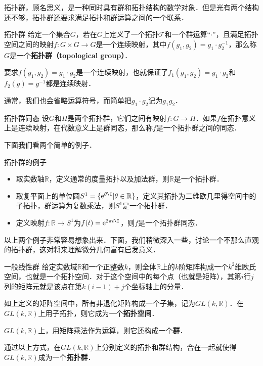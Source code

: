 

拓扑群，顾名思义，是一种同时具有群和拓扑结构的数学对象．但是光有两个结构还不够，拓扑群还要求满足拓扑和群运算之间的一个联系．

\begin{definition}{拓扑群}
给定一个集合$G$，若在$G$上定义了一个拓扑$\mathcal{T}$和一个群运算“$\cdot$”，且满足拓扑空间之间的映射$f:G\times G\rightarrow G$是一个连续映射，其中$f(g_1, g_2)=g_1\cdot g_2^{-1}$，那么称$G$是一个\textbf{拓扑群（topological group）}．
\end{definition}

要求$f(g_1, g_2)=g_1\cdot g_2$是一个连续映射，也就保证了$f_1(g_1, g_2)=g_1\cdot g_2$和$f_2(g)=g^{-1}$都是连续映射．

通常，我们也会省略运算符号，而简单把$g_1\cdot g_2$记为$g_1g_2$．

\begin{definition}{拓扑群同态}
设$G$和$H$是两个拓扑群，它们之间有映射$f:G\rightarrow H$．如果$f$在拓扑意义上是连续映射，在代数意义上是群同态，那么称$f$是一个拓扑群之间的同态．
\end{definition}

下面我们看两个简单的例子．

\begin{example}{拓扑群的例子}
\begin{itemize}
\item 取实数轴$\mathbb{R}$，定义通常的度量拓扑以及加法群，则$\mathbb{R}$是一个拓扑群．
\item 取复平面上的单位圆$S^1=\{\mathrm{e}^{\theta\I}|\theta\in\mathbb{R}\}$，定义其拓扑为二维欧几里得空间中的子拓扑，群运算为复数乘法，则$S^1$是一个拓扑群．
\item 定义映射$f:\mathbb{R}\rightarrow S^1$为$f(t)=\mathrm{e}^{2\pi t\I}$，则$f$是一个拓扑群同态．
\end{itemize}
\end{example}

以上两个例子非常容易想象出来．下面，我们稍微深入一些，讨论一个不那么直观的拓扑群，这对将来理解微分几何富有启发意义．

\begin{example}{一般线性群}
给定实数域$\mathbb{R}$和一个正整数$k$，则全体$\mathbb{R}$上的$k$阶矩阵构成一个$k^2$维欧氏空间，也就是一个拓扑空间．对于这个空间中的每个点（也就是矩阵），其第$i$行$j$列的矩阵元就是该点在第$k(i-1)+j$个坐标轴上的分量．

如上定义的矩阵空间中，所有非退化矩阵构成一个子集，记为$GL(k, \mathbb{R})$．在$GL(k,\mathbb{R})$上用子拓扑，则它成为一个\textbf{拓扑空间}．

$GL(k,\mathbb{R})$上，用矩阵乘法作为运算，则它还构成一个\textbf{群}．

通过以上方式，在$GL(k, \mathbb{R})$上分别定义的拓扑和群结构，合在一起就使得$GL(k, \mathbb{R})$成为一个\textbf{拓扑群}．
\end{example}

